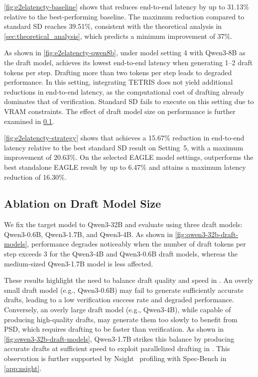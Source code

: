 \cref{fig:e2elatencty-baseline} shows that \alg{} reduces end-to-end latency by up to 31.13\% relative to the best-performing baseline. The maximum reduction compared to standard SD reaches 39.51\%, consistent with the theoretical analysis in \cref{sec:theoretical_analysis}, which predicts a minimum improvement of 37\%.

As shown in \cref{fig:e2elatencty-qwen8b}, under model setting 4 with Qwen3-8B as the draft model, \alg{} achieves its lowest end-to-end latency when generating 1--2 draft tokens per step. Drafting more than two tokens per step leads to degraded performance. In this setting, integrating TETRIS does not yield additional reductions in end-to-end latency, as the computational cost of drafting already dominates that of verification. Standard SD fails to execute on this setting due to VRAM constraints. The effect of draft model size on performance is further examined in \cref{app:exp-draft-model}.


\cref{fig:e2elatencty-strategy} shows that \alg{} achieves a 15.67\% reduction in end-to-end latency relative to the best standard SD result on Setting~5, with a maximum improvement of 20.63\%. On the selected EAGLE model settings, \alg{} outperforms the best standalone EAGLE result by up to 6.47\% and attains a maximum latency reduction of 16.30\%.


\subsection{Ablation on Draft Model Size}
\label{app:exp-draft-model}
We fix the target model to Qwen3-32B and evaluate \alg{} using three draft models: Qwen3-0.6B, Qwen3-1.7B, and Qwen3-4B. As shown in \cref{fig:qwen3-32b-draft-models}, performance degrades noticeably when the number of draft tokens per step exceeds $3$ for the Qwen3-4B and Qwen3-0.6B draft models, whereas the medium-sized Qwen3-1.7B model is less affected.

These results highlight the need to balance draft quality and speed in \alg{}. An overly small draft model (e.g., Qwen3-0.6B) may fail to generate sufficiently accurate drafts, leading to a low verification success rate and degraded performance. Conversely, an overly large draft model (e.g., Qwen3-4B), while capable of producing high-quality drafts, may generate them too slowly to benefit from PSD, which requires drafting to be faster than verification. As shown in \cref{fig:qwen3-32b-draft-models}, Qwen3-1.7B strikes this balance by producing accurate drafts at sufficient speed to exploit parallelized drafting in \alg{}. This observation is further supported by Nsight~\citep{NVIDIA_Nsight_Systems_2024} profiling with Spec-Bench in \cref{app:nsight}.


